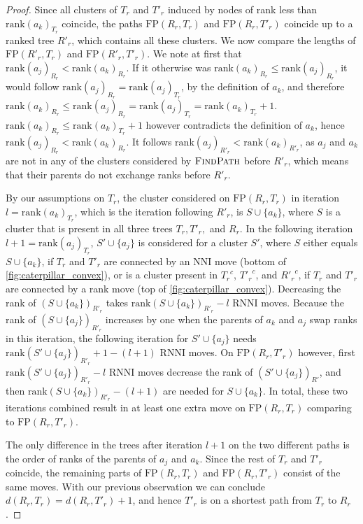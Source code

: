 \documentclass[11pt]{amsart}
\newcommand{\rnni}{\mathrm{RNNI}}
\newcommand{\findpath}{\textsc{FindPath}}
\newcommand{\rank}{\mathrm{rank}}
\newcommand{\nni}{\mathrm{NNI}}
\newcommand{\fp}{\mathrm{FP}}
\begin{document}
\begin{proof}
	Since all clusters of $T_r$ and $T'_r$ induced by nodes of rank less than $\rank(a_k)_{T_r}$ coincide, the paths $\fp(R_r,T_r)$ and $\fp(R_r,T'_r)$ coincide up to a ranked tree $R'_r$, which contains all these clusters.
	We now compare the lengths of $\fp(R'_r,T_r)$ and $\fp(R'_r,T'_r)$.
	We note at first that $\rank(a_j)_{R_r} < \rank(a_k)_{R_r}$.
	If it otherwise was $\rank(a_k)_{R_r} \leq \rank(a_j)_{R_r}$, it would follow $\rank(a_j)_{R_r} = \rank(a_j)_{T_r}$, by the definition of $a_k$, and therefore  $\rank(a_k)_{R_r} \leq \rank(a_j)_{R_r} = \rank(a_j)_{T_r} = \rank(a_k)_{T_r} + 1$.
	$\rank(a_k)_{R_r} \leq \rank(a_k)_{T_r} + 1$ however contradicts the definition of $a_k$, hence $\rank(a_j)_{R_r} < \rank(a_k)_{R_r}$.
	It follows $\rank(a_j)_{R'_r} < \rank(a_k)_{R'_r}$, as $a_j$ and $a_k$ are not in any of the clusters considered by $\findpath$ before $R'_r$, which means that their parents do not exchange ranks before $R'_r$.

	By our assumptions on $T_r$, the cluster considered on $\fp(R_r,T_r)$ in iteration $l = \rank(a_k)_{T_r}$, which is the iteration following $R'_r$, is $S \cup \{a_k\}$, where $S$ is a cluster that is present in all three trees $T_r, T'_r,$ and $R_r$.
	In the following iteration $l+1 = \rank(a_j)_{T_r}$, $S' \cup \{a_j\}$ is considered for a cluster $S'$, where $S$ either equals $S \cup \{a_k\}$, if $T_r$ and $T'_r$ are connected by an $\nni$ move (bottom of \autoref{fig:caterpillar_convex}), or is a cluster present in ${T_r}^c$, ${T'_r}^c$, and ${R'_r}^c$, if $T_r$ and $T'_r$ are connected by a rank move (top of \autoref{fig:caterpillar_convex}).
	Decreasing the rank of $(S \cup \{a_k\})_{R'_r}$ takes $\rank(S \cup \{a_k\})_{R'_r} - l$ $\rnni$ moves.
	Because the rank of $(S \cup \{a_j\})_{R'_r}$ increases by one when the parents of $a_k$ and $a_j$ swap ranks in this iteration, the following iteration for $S' \cup \{a_j\}$ needs $\rank(S' \cup \{a_j\})_{R'_r} + 1 - (l+1)$ $\rnni$ moves.
	On $\fp(R_r,T'_r)$ however, first $\rank(S' \cup \{a_j\})_{R'_r} - l$ $\rnni$ moves decrease the rank of $(S' \cup \{a_j\})_{R'}$, and then $\rank(S \cup \{a_k\})_{R'_r} - (l+1)$ are needed for $S \cup \{a_k\}$.
	In total, these two iterations combined result in at least one extra move on $\fp(R_r, T_r)$ comparing to $\fp(R_r, T'_r)$.

	The only difference in the trees after iteration $l+1$ on the two different paths is the order of ranks of the parents of $a_j$ and $a_k$.
	Since the rest of $T_r$ and $T'_r$ coincide, the remaining parts of $\fp(R_r, T_r)$ and $\fp(R_r, T'_r)$ consist of the same moves.
	With our previous observation we can conclude $d(R_r,T_r) = d(R_r,T'_r) + 1$, and hence $T'_r$ is on a shortest path from $T_r$ to $R_r$.
\end{proof}
\end{document}
